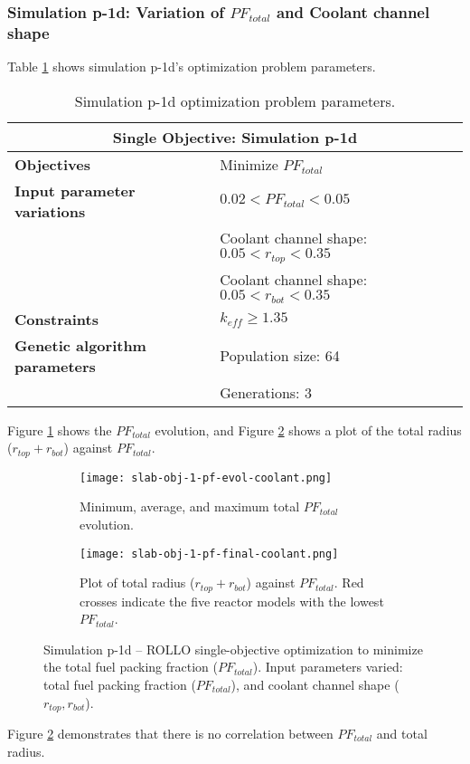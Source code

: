 \subsubsection{Simulation p-1d: Variation of $PF_{total}$ and Coolant channel shape}
Table \ref{tab:simulationp1d} shows simulation p-1d's optimization problem parameters. 
\begin{table}[htbp!]
    \centering
    \onehalfspacing
    \caption{Simulation p-1d optimization problem parameters.}
	\label{tab:simulationp1d}
    \footnotesize
    \begin{tabular}{l|p{6.5cm}}
    \hline 
    \multicolumn{2}{c}{\textbf{Single Objective: Simulation p-1d}} \\
    \hline 
    \textbf{Objectives} & Minimize $PF_{total}$\\
    \hline 
    \textbf{Input parameter variations} & $0.02<PF_{total}<0.05$ \\
    & Coolant channel shape: $0.05<r_{top}<0.35$ \\
    & Coolant channel shape: $0.05<r_{bot}<0.35$ \\
    \hline
    \textbf{Constraints} & $k_{eff} \geq 1.35$\\ 
    \hline 
    \textbf{Genetic algorithm parameters} & Population size: 64 \\
    & Generations: 3 \\
    \hline
    \end{tabular}
\end{table}

Figure \ref{fig:slab-obj-1-pf-evol-coolant} shows the $PF_{total}$ evolution, 
and Figure \ref{fig:slab-obj-1-pf-final-coolant} shows a plot of the total radius 
($r_{top} + r_{bot}$) against $PF_{total}$. 
\begin{figure}[htbp!]
    \centering
    \begin{subfigure}{\textwidth}
        \texttt{[image: slab-obj-1-pf-evol-coolant.png]}
        \caption{Minimum, average, and maximum total $PF_{total}$ evolution.}
        \label{fig:slab-obj-1-pf-evol-coolant} 
    \end{subfigure}
    \begin{subfigure}{\textwidth}
        \texttt{[image: slab-obj-1-pf-final-coolant.png]}
        \caption{Plot of total radius ($r_{top} + r_{bot}$) against $PF_{total}$. 
        Red crosses indicate the five reactor models with the 
        lowest $PF_{total}$.}
        \label{fig:slab-obj-1-pf-final-coolant} 
    \end{subfigure}
    \caption{Simulation p-1d -- ROLLO single-objective optimization to minimize 
    the total fuel packing fraction ($PF_{total}$). 
    Input parameters varied: total fuel packing fraction 
    ($PF_{total}$), and coolant channel shape ($r_{top}, r_{bot}$).}
    \label{fig:slab-obj-1-pf-coolant}
\end{figure}
Figure \ref{fig:slab-obj-1-pf-final-coolant} demonstrates that there is no correlation 
between $PF_{total}$ and total radius. 

